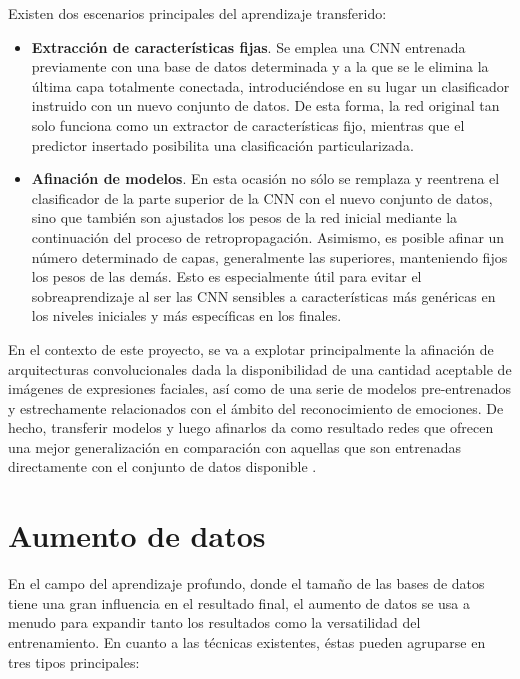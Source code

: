 Existen dos escenarios principales del aprendizaje transferido:
\begin{itemize}
  \item \textbf{Extracción de características fijas}. Se emplea una CNN entrenada previamente con una base de datos determinada y a la que se le elimina la última capa totalmente conectada, introduciéndose en su lugar un clasificador instruido con un nuevo conjunto de datos. De esta forma, la red original tan solo funciona como un extractor de características fijo, mientras que el predictor insertado posibilita una clasificación particularizada.
  \item \textbf{Afinación de modelos}. En esta ocasión no sólo se remplaza y reentrena el clasificador de la parte superior de la CNN con el nuevo conjunto de datos, sino que también son ajustados los pesos de la red inicial mediante la continuación del proceso de retropropagación. Asimismo, es posible afinar un número determinado de capas, generalmente las superiores, manteniendo fijos los pesos de las demás. Esto es especialmente útil para evitar el sobreaprendizaje al ser las CNN sensibles a características más genéricas en los niveles iniciales y más específicas en los finales.
\end{itemize}

En el contexto de este proyecto, se va a explotar principalmente la afinación de arquitecturas convolucionales dada la disponibilidad de una cantidad aceptable de imágenes de expresiones faciales, así como de una serie de modelos pre-entrenados y estrechamente relacionados con el ámbito del reconocimiento de emociones. De hecho, transferir modelos y luego afinarlos da como resultado redes que ofrecen una mejor generalización en comparación con aquellas que son entrenadas directamente con el conjunto de datos disponible \cite{TransferLearning}.

\section{Aumento de datos} \label{Chapter:DataAugmentation}

En el campo del aprendizaje profundo, donde el tamaño de las bases de datos tiene una gran influencia en el resultado final, el aumento de datos se usa a menudo para expandir tanto los resultados como la versatilidad del entrenamiento. En cuanto a las técnicas existentes, éstas pueden agruparse en tres tipos principales:

